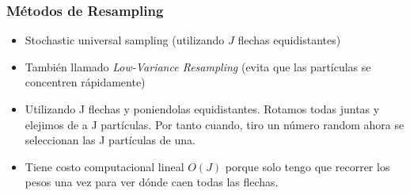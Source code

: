 \begin{frame}
    \frametitle{Métodos de Resampling}

    \footnotesize


    \begin{itemize}
        \item Stochastic universal sampling (utilizando $J$ flechas equidistantes)
        \item También llamado \emph{Low-Variance Resampling} (evita que las partículas se concentren rápidamente)
        \item Utilizando J flechas y poniendolas equidistantes. Rotamos todas juntas y elejimos de a J partículas. Por tanto cuando, tiro un número random ahora se seleccionan las J partículas de una.
        \item Tiene costo computacional lineal $O(J)$ porque solo tengo que recorrer los pesos una vez para ver dónde caen todas las flechas.
    \end{itemize}

\end{frame}

